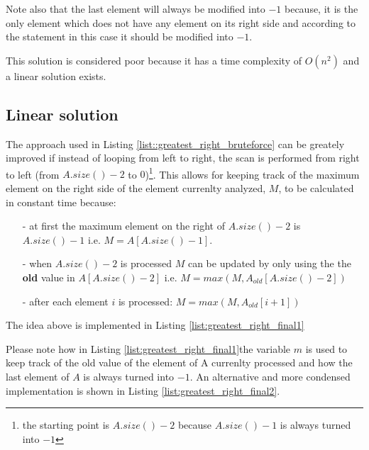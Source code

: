 Note also that the last element will always be modified into $-1$ because, it is the only element which does not have any element on its right side and according to the statement in this case it should be modified into $-1$.

This solution is considered poor because it has a time complexity of $O(n^2)$ and a linear solution exists. 

\subsection{Linear solution}
\label{sec:greatest_right:linear}
The approach used in Listing \ref{list::greatest_right_bruteforce} can be greately improved if instead of looping from left to right, the scan is performed from right to left (from $A.size()-2$ to $0$)\footnote{the starting point is $A.size()-2$ because $A.size()-1$ is always turned into $-1$}. This allows for keeping track of the maximum element on the right  side of the element currenlty analyzed, $M$, to be calculated in constant time because:
\begin{itemize}
	\item[-] at first the maximum element on the right of $A.size()-2$ is $A.size()-1$ i.e. $M = A[A.size()-1]$.
	\item[-] when $A.size()-2$ is processed $M$ can be updated by only using the the \textbf{old} value in $A[A.size()-2]$ i.e. $M= max(M, A_{old}[A.size()-2])$
	\item[-] after each element $i$ is processed: $M= max(M, A_{old}[i+1])$
\end{itemize}

The idea above is implemented in Listing \ref{list:greatest_right_final1}

	

Please note how in Listing \ref{list:greatest_right_final1}the variable $m$ is used to keep track of the old value of the element of A currenlty processed and how the  last element of $A$ is always turned into $-1$.
An alternative and more condensed implementation  is shown in Listing \ref{list:greatest_right_final2}.

	